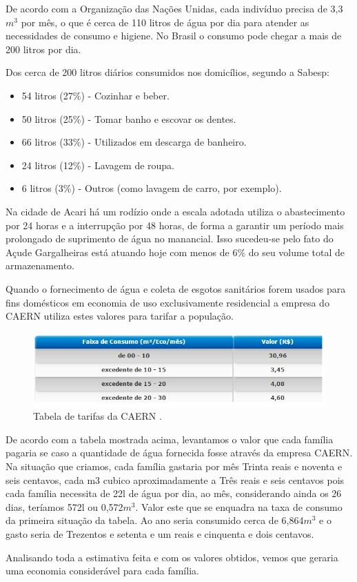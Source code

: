       De acordo com a Organização das Nações Unidas, cada indivíduo precisa de 3,3 $m^3$ por mês, o que é cerca de 110
      litros de água por dia para atender as necessidades de consumo e higiene. No Brasil o consumo pode chegar a mais
      de 200 litros por dia.
      
      Dos cerca de 200 litros diários consumidos nos domicílios, segundo a Sabesp:
      \begin{itemize}
	\item 54 litros (27\%) - Cozinhar e beber.
	\item 50 litros (25\%) - Tomar banho e escovar os dentes.
	\item 66 litros (33\%) - Utilizados em descarga de banheiro.
	\item 24 litros (12\%) - Lavagem de roupa.
	\item 6 litros (3\%) - Outros (como lavagem de carro, por exemplo).
      \end{itemize}
      
      Na cidade de Acari há um rodízio onde a escala adotada utiliza o abastecimento por 24 horas e a interrupção por 48 horas,
      de forma a garantir um período mais prolongado de suprimento de água no manancial. Isso sucedeu-se pelo fato do Açude
      Gargalheiras está atuando hoje com menos de 6\% do seu volume total de armazenamento.
      
      Quando o fornecimento de água e coleta de esgotos sanitários forem usados para fins domésticos em economia de uso
      exclusivamente residencial a empresa do CAERN utiliza estes valores para tarifar a população.
      
      \FloatBarrier
      \begin{figure}[!h]
	  \centering
	  \includegraphics[scale = 0.9]{editaveis/figuras/custo_caern}
	  \caption[Tabela de tarifas da CAERN]{Tabela de tarifas da CAERN \footnotemark.}
	  \label{custo_caern}
      \end{figure}
      \FloatBarrier
      
      De acordo com a tabela mostrada acima, levantamos o valor que cada família pagaria se caso a quantidade de água fornecida fosse através da empresa CAERN. Na situação que criamos, cada família gastaria por mês Trinta reais e noventa e seis centavos, cada m3 cubico aproximadamente a Três reais e seis centavos pois cada família necessita de 22l de água por dia, ao mês, considerando ainda os 26 dias, teríamos 572l ou 0,572$m^3$. Valor este que se enquadra na taxa de consumo da primeira situação da tabela. Ao ano seria consumido cerca de 6,864$m^3$ e o gasto seria de Trezentos e setenta e um reais e cinquenta e dois centavos. 
      
      Analisando toda a estimativa feita e com os valores obtidos, vemos que geraria uma economia considerável para cada família.
      
 